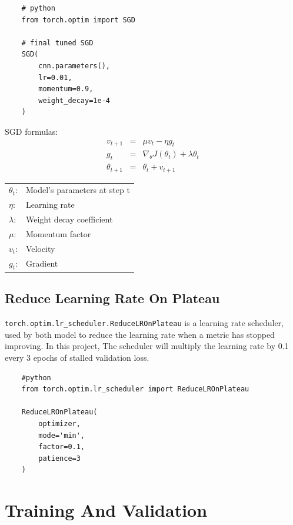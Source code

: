 \documentclass{report}
\begin{document}
\begin{verbatim}
    # python
    from torch.optim import SGD

    # final tuned SGD
    SGD(
        cnn.parameters(),
        lr=0.01,
        momentum=0.9,
        weight_decay=1e-4
    )
\end{verbatim}

SGD formulas:
\[
\begin{array}{rcl}
    v_{t+1}      & = & \mu v_t - \eta g_t                               \\ [0.2cm]
    g_t          & = & \nabla_{\theta} J(\theta_t) + \lambda \theta_t   \\ [0.2cm]
    \theta_{t+1} & = & \theta_t + v_{t+1}  
\end{array}
\]

\begin{center}
    \begin{tabular}{ll}
        $\theta_t$: & Model's parameters at step t      \\
        $\eta$:     & Learning rate                     \\
        $\lambda$:  & Weight decay coefficient          \\
        $\mu$:      & Momentum factor                   \\
        $v_t$:      & Velocity                          \\
        $g_t$:      & Gradient 
    \end{tabular}   
\end{center}

\subsection{Reduce Learning Rate On Plateau}
\texttt{torch.optim.lr\_scheduler.ReduceLROnPlateau} is a learning rate scheduler, used by both model to reduce 
the learning rate when a metric has stopped improving. In this project, The scheduler will multiply the learning
rate by 0.1 every 3 epochs of stalled validation loss.

\begin{verbatim}
    #python
    from torch.optim.lr_scheduler import ReduceLROnPlateau

    ReduceLROnPlateau(
        optimizer,
        mode='min', 
        factor=0.1, 
        patience=3
    )
\end{verbatim}

\section{Training And Validation}
\end{document}
